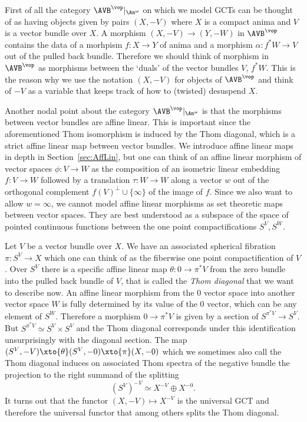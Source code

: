 First of all the category $\AVB^\vop|_{\An^\omega}$ on which we model GCTs can be thought of as having objects given by pairs $(X,-V)$ where $X$ is a compact anima and $V$ is a vector bundle over $X$.
A morphism $(X,-V) \to (Y,-W)$ in $\AVB^\vop$ contains the data of a morhpism $f \colon X \to Y$ of anima and a morphism 
$\alpha \colon f^*W \to V$ out of the pulled back bundle.
Therefore we should think of morphism in $\AVB^\vop$ as morphisms between the `duals' of the vector bundles $V$, $f^*W$.
This is the reason why we use the notation $(X,-V)$ for objects of $\AVB^\vop$ and think of $-V$ as a
variable that keeps track of how to (twisted) desuspend $X$.

Another nodal point about the category $\AVB^\vop|_{\An^\omega}$ is that the morphisms between 
vector bundles are affine linear. This is important since the aforementioned Thom isomorphism is 
induced by the Thom diagonal, which is a strict affine linear map between vector bundles.
We introduce affine linear maps in depth in Section~\ref{sec:AffLin}, but one can think of 
an affine linear morphism of vector spaces $\phi \colon V \to W$ as the composition 
of an isometric linear embedding $f \colon V \to W$ followed by a translation $\tau \colon W \to W$ along a vector 
$w$ out of the orthogonal complement $f(V)^\perp \cup \{\infty\}$ of the image of $f$.
Since we also want to allow $w = \infty$, we cannot model affine linear morphisms as set theoretic maps between vector spaces. 
They are best understood as a subspace of the space of pointed continuous functions between the one point compactifications $S^V,S^W$.

Let $V$ be a vector bundle over $X$. We have an associated spherical fibration $\pi \colon S^V \to X$
which one can think of as the fiberwise one point compactification of $V$. 
Over $S^V$ there is a specific affine linear map $\theta \colon 0 \to \pi^*V$ from the zero bundle into the 
pulled back bundle of $V$, that is called the \emph{Thom diagonal} that we want to describe now. 
An affine linear morphism from the $0$ vector space into another vector space $W$ is fully 
determined by its value of the $0$ vector, which can be any element of $S^W$.
Therefore a morphism $0 \to \pi^*V$ is given by a section of $S^{\pi^*V} \to S^V$.
But $S^{\pi^*V} \simeq S^V \times S^V$ and the Thom diagonal corresponds under this identification 
unsurprisingly with the diagonal section.
The map $(S^V, -V) \xto{\theta} (S^V, -0) \xto{\pi} (X, -0)$ which we sometimes also call the Thom diagonal induces on associated 
Thom spectra of the negative bundle the projection to the right summand of the splitting 
\[
  (S^V)^{-V} \simeq X^{-V} \oplus X^{-0}.
\]
It turns out that the functor $(X,-V) \mapsto X^{-V}$ is the universal GCT and therefore the universal functor 
that among others splits the Thom diagonal.

